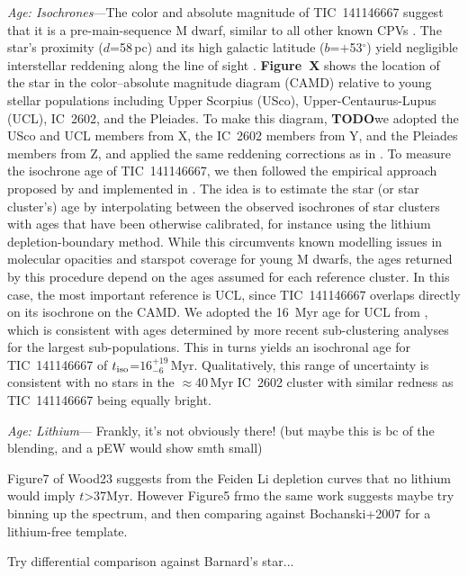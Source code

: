 \documentclass{nature3}
\begin{document}
\begin{methods}
{\it Age: Isochrones}---The color and absolute magnitude of
TIC~141146667 suggest that it is a pre-main-sequence M dwarf, similar
to all other known CPVs \cite{Stauffer2017,Stauffer2021,Bouma2024}.
The star's proximity ($d$=58\,pc) and its high galactic latitude
($b$=$+$53$^\circ$) yield negligible interstellar reddening along the
line of sight \cite{Green2019}.
{\bf Figure~X} shows the location of the star in the color--absolute
magnitude diagram (CAMD)
relative to young stellar populations including Upper Scorpius (USco),
Upper-Centaurus-Lupus (UCL), IC~2602, and the Pleiades.
To make this diagram, {\bf TODO}we adopted the USco and UCL members
from X, the IC~2602 members from Y, and the Pleiades members from Z,
and applied the same reddening corrections as in \cite{Bouma2022}.
To measure the isochrone age of TIC~141146667, we then followed the 
empirical approach proposed by \cite{Gagne2020} and
implemented in \cite{Bouma2022}.
The idea is to estimate the star (or star cluster's) age by
interpolating between the observed isochrones of star clusters with
ages that have been otherwise calibrated, for instance using
the lithium depletion-boundary method.
While this circumvents known modelling issues in molecular opacities
and starspot coverage for young M dwarfs,
the ages returned by this procedure depend on the ages
assumed for each reference cluster.
In this case, the most important reference is UCL, since TIC~141146667
overlaps directly on its isochrone on the CAMD.
We adopted the 16~Myr age for UCL from \cite{PecautMamajek2016}, which
is consistent with ages determined by more recent sub-clustering
analyses \cite{Ratzenbock2023} for the largest sub-populations.
This in turns yields an isochronal age for TIC~141146667 of
$t_{\rm iso}$=$16^{+19}_{-6}$\,Myr.
Qualitatively, this range of uncertainty is consistent with no stars
in the $\approx$40\,Myr IC~2602 cluster with similar redness as
TIC~141146667 being equally bright.

{\it Age: Lithium}--- Frankly, it's not obviously there!  (but maybe
this is bc of the blending, and a pEW would show smth small)

Figure7 of Wood23 suggests from the Feiden Li depletion curves that no lithium would imply $t$>37Myr.
However Figure5 frmo the same work suggests maybe try binning up the spectrum, and then comparing against Bochanski+2007 for a lithium-free template.

Try differential comparison against Barnard's star...


\end{methods}
\end{document}
